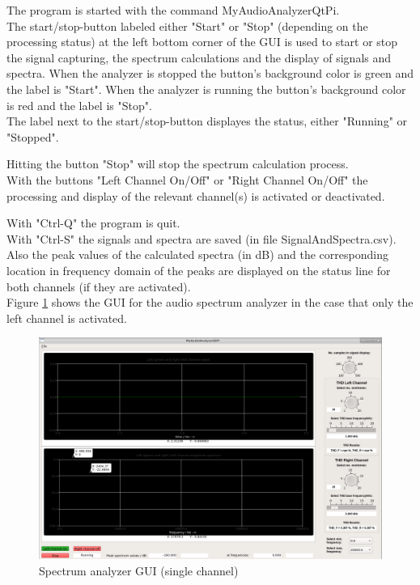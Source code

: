 \documentclass[11pt, oneside]{scrartcl}   	%
\begin{document}
The program is started with the command MyAudioAnalyzerQtPi.\\

The start/stop-button labeled either "Start" or "Stop" (depending on the processing status) at the left bottom corner of the GUI is used to start or stop the signal capturing, the spectrum calculations and the display of signals and spectra.
When the analyzer is stopped the button's background color is green and the label is "Start". When the analyzer is running the button's background color is red and the label is "Stop".\\

The label next to the start/stop-button displayes the status, either "Running" or "Stopped".
 
Hitting the button "Stop" will stop the spectrum calculation process.\\

With the buttons "Left Channel On/Off" or "Right Channel On/Off" the processing and display of the relevant channel(s) is activated or deactivated.

With "Ctrl-Q" the program is quit. \\

With "Ctrl-S" the signals and spectra are saved (in file SignalAndSpectra.csv).\\

Also the peak values of the calculated spectra (in dB) and the corresponding location in frequency domain of the peaks are displayed on the status line for both channels (if they are activated).\\

Figure \ref{fig:SpectrumAnalyzerGUI2} shows the GUI for the audio spectrum analyzer in the case that only the left channel is activated.
\begin{figure}[tbph]
	\centering
	\includegraphics[width=\linewidth]{MyAudioSpectrumAnalyzerGUILeftChannel.png}
	\caption[Spectrum analyzer GUI (single channel)]{Spectrum analyzer GUI (single channel)}
	\label{fig:SpectrumAnalyzerGUI2}
\end{figure}
\end{document}
